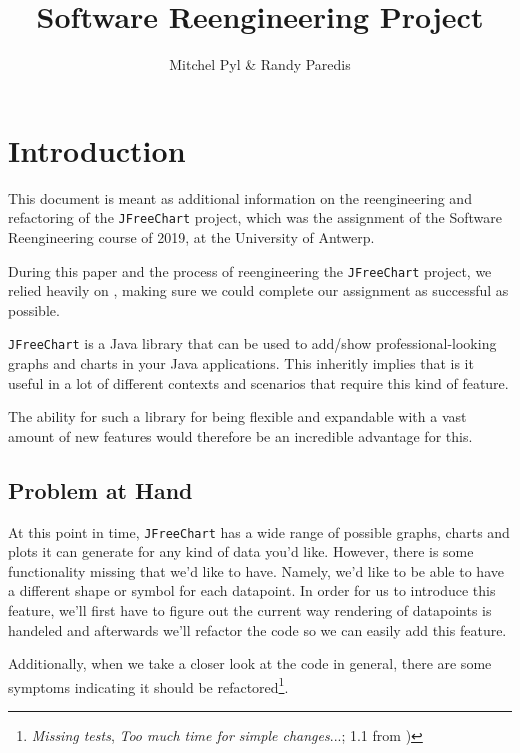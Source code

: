 \documentclass[11pt]{article}
\begin{document}
	\title{Software Reengineering Project}
	\author{Mitchel Pyl \& Randy Paredis}
	\date{}
	
	\maketitle
	
	\section{Introduction}
	This document is meant as additional information on the reengineering and refactoring of the \texttt{JFreeChart} project, which was the assignment of the \textsf{Software Reengineering} course of 2019, at the \textsf{University of Antwerp}.
	
	During this paper and the process of reengineering the \texttt{JFreeChart} project, we relied heavily on \cite{demeyer2009object}, making sure we could complete our assignment as successful as possible.
	
	\texttt{JFreeChart} \cite{jfreechart} is a Java library that can be used to add/show professional-looking graphs and charts in your Java applications. This inheritly implies that is it useful in a lot of different contexts and scenarios that require this kind of feature.
	
	The ability for such a library for being flexible and expandable with a vast amount of new features would therefore be an incredible advantage for this.
	
	\subsection{Problem at Hand}
	\label{sec:pah}
	At this point in time, \texttt{JFreeChart} has a wide range of possible graphs, charts and plots it can generate for any kind of data you'd like. However, there is some functionality missing that we'd like to have. Namely, we'd like to be able to have a different shape or symbol for each datapoint. In order for us to introduce this feature, we'll first have to figure out the current way rendering of datapoints is handeled and afterwards we'll refactor the code so we can easily add this feature.
	
	Additionally, when we take a closer look at the code in general, there are some symptoms indicating it should be refactored\footnote{\textit{Missing tests}, \textit{Too much time for simple changes}...; 1.1 from \cite{demeyer2009object})}.
	
\end{document}

